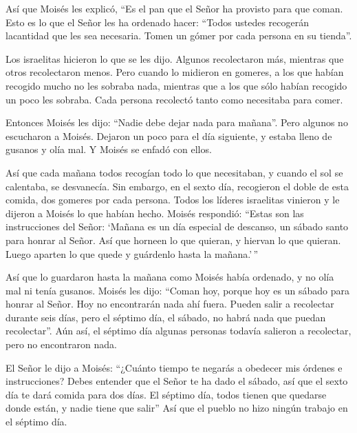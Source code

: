 Así que Moisés les explicó, ``Es el pan que el Señor ha provisto para
que coman.  Esto es lo que el Señor les ha ordenado hacer:
``Todos ustedes recogerán lacantidad que les sea necesaria. Tomen un
gómer por cada persona en su tienda''.

 Los israelitas hicieron lo que se les dijo. Algunos
recolectaron más, mientras que otros recolectaron menos. 
Pero cuando lo midieron en gomeres, a los que habían recogido mucho no
les sobraba nada, mientras que a los que sólo habían recogido un poco
les sobraba. Cada persona recolectó tanto como necesitaba para comer.

 Entonces Moisés les dijo: ``Nadie debe dejar nada para
mañana''.  Pero algunos no escucharon a Moisés. Dejaron un
poco para el día siguiente, y estaba lleno de gusanos y olía mal. Y
Moisés se enfadó con ellos.

 Así que cada mañana todos recogían todo lo que
necesitaban, y cuando el sol se calentaba, se desvanecía. 
Sin embargo, en el sexto día, recogieron el doble de esta comida, dos
gomeres por cada persona. Todos los líderes israelitas vinieron y le
dijeron a Moisés lo que habían hecho.  Moisés respondió:
``Estas son las instrucciones del Señor: `Mañana es un día especial de
descanso, un sábado santo para honrar al Señor. Así que horneen lo que
quieran, y hiervan lo que quieran. Luego aparten lo que quede y
guárdenlo hasta la mañana.'\,''

 Así que lo guardaron hasta la mañana como Moisés había
ordenado, y no olía mal ni tenía gusanos.  Moisés les dijo:
``Coman hoy, porque hoy es un sábado para honrar al Señor. Hoy no
encontrarán nada ahí fuera.  Pueden salir a recolectar
durante seis días, pero el séptimo día, el sábado, no habrá nada que
puedan recolectar''.  Aún así, el séptimo día algunas
personas todavía salieron a recolectar, pero no encontraron nada.

 El Señor le dijo a Moisés: ``¿Cuánto tiempo te negarás a
obedecer mis órdenes e instrucciones?  Debes entender que
el Señor te ha dado el sábado, así que el sexto día te dará comida para
dos días. El séptimo día, todos tienen que quedarse donde están, y nadie
tiene que salir''  Así que el pueblo no hizo ningún trabajo
en el séptimo día.

